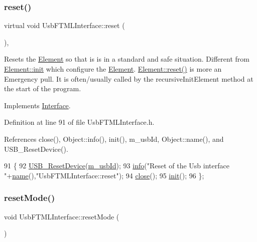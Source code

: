 \subsubsection{\texorpdfstring{reset()}{reset()}}
{\footnotesize\ttfamily virtual void Usb\+F\+T\+M\+L\+Interface\+::reset (\begin{DoxyParamCaption}{ }\end{DoxyParamCaption})\hspace{0.3cm}{\ttfamily [inline]}, {\ttfamily [virtual]}}

Resets the \hyperlink{classElement}{Element} so that is is in a standard and safe situation. Different from \hyperlink{classElement_af42754b5cabc198869222725218d695c}{Element\+::init} which configure the \hyperlink{classElement}{Element}. \hyperlink{classElement_a69efffa22f06909d768149715565cb56}{Element\+::reset()} is more an Emergency pull. It is often/usually called by the recursive\+Init\+Element method at the start of the program. 

Implements \hyperlink{classInterface_a4d44329cea9981a9e0392eaaf99efadd}{Interface}.



Definition at line 91 of file Usb\+F\+T\+M\+L\+Interface.\+h.



References close(), Object\+::info(), init(), m\+\_\+usb\+Id, Object\+::name(), and U\+S\+B\+\_\+\+Reset\+Device().


\begin{DoxyCode}
91                        \{
92     \hyperlink{LALUsbML_8h_a77b48cfbf9075545430b778cd4ad777f}{USB\_ResetDevice}(\hyperlink{classUsbFTMLInterface_aab6754587c303660d5c498ce34a2b4c8}{m\_usbId});
93     \hyperlink{classObject_a644fd329ea4cb85f54fa6846484b84a8}{info}(\textcolor{stringliteral}{"Reset of the Usb interface "}+\hyperlink{classObject_a300f4c05dd468c7bb8b3c968868443c1}{name}(),\textcolor{stringliteral}{"UsbFTMLInterface::reset"});
94     \hyperlink{classUsbFTMLInterface_a1eaa27bd62bc381f60aa837f70a70117}{close}();
95     \hyperlink{classUsbFTMLInterface_a7f7c96ece97e607b88425823a2923a43}{init}();
96   \};
\end{DoxyCode}
\mbox{\label{classUsbFTMLInterface_a91063d4374b617177c6b7a4022385dd1}} 
\subsubsection{\texorpdfstring{reset\+Mode()}{resetMode()}}
{\footnotesize\ttfamily void Usb\+F\+T\+M\+L\+Interface\+::reset\+Mode (\begin{DoxyParamCaption}{ }\end{DoxyParamCaption})\hspace{0.3cm}{\ttfamily [inline]}}




